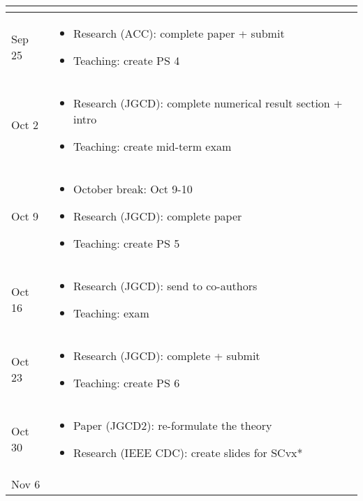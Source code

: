 \documentclass{article}
\begin{document}
\begin{center}
\begin{xltabular}{\linewidth}{ s | M }
\begin{itemize}
\end{itemize}
\\
\hline
Sep 25 	&
\begin{itemize}
\item 
Research (ACC): complete paper + submit
\item 
Teaching: create PS 4
\end{itemize}
\\
\hline
Oct 2 	&
\begin{itemize}
\item 
Research (JGCD): complete numerical result section + intro
\item 
Teaching: create mid-term exam
\end{itemize}
\\
\hline
Oct 9 	&
\begin{itemize}
\item 
October break: Oct 9-10
\item 
Research (JGCD): complete paper
\item 
Teaching: create PS 5
\end{itemize}
\\
\hline
Oct 16 	&
\begin{itemize}
\item 
Research (JGCD): send to co-authors
\item 
Teaching: exam
\end{itemize}
\\
\hline
Oct 23 	&
\begin{itemize}
\item 
Research (JGCD): complete + submit
\item 
Teaching: create PS 6
\end{itemize}
\\
\hline
Oct 30 	&
\begin{itemize}
\item 
Paper (JGCD2): re-formulate the theory
\item 
Research (IEEE CDC): create slides for SCvx*
\end{itemize}
\\
\hline
Nov 6 	&
\begin{itemize}

\end{itemize}
\end{xltabular}
\end{center}
\end{document}
